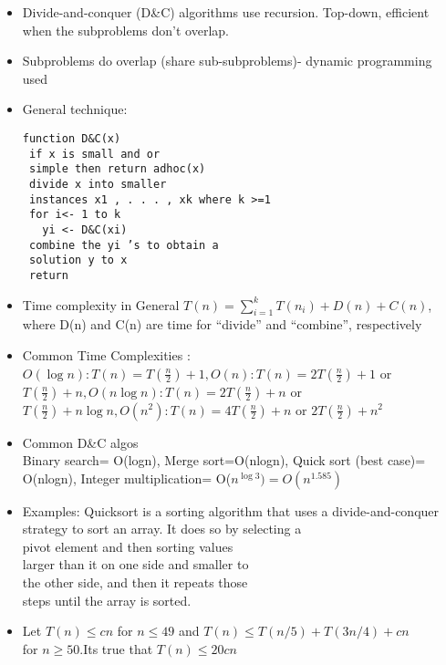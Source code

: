     \begin{itemize}[label=\bullet]
        \item Divide-and-conquer (D\&C) algorithms use recursion. Top-down, efficient when the subproblems don’t overlap.
        
         \item Subproblems do overlap (share sub-subproblems)-  dynamic programming used

        \item
        General technique:
        \begin{verbatim}
function D&C(x)
 if x is small and or 
 simple then return adhoc(x)
 divide x into smaller 
 instances x1 , . . . , xk where k >=1
 for i<- 1 to k
   yi <- D&C(xi)
 combine the yi ’s to obtain a 
 solution y to x
 return 
\end{verbatim}
\item Time complexity  in General
$T(n) = \sum_{i=1}^k T(n_i ) + D(n) +C(n)$, where D(n) and C(n) are time for “divide” and “combine”,
respectively
\item  Common Time Complexities :
\\$O(\log n):T(n)=T(\frac{n}{2})+1,  O(n):T(n)=2T(\frac{n}{2})+1$ or $T(\frac{n}{2})+n, O(n \log n): T(n)=2T(\frac{n}{2})+n$ or $T(\frac{n}{2})+n \log n, O(n^2): T(n)=4T(\frac{n}{2})+n$ or $2T(\frac{n}{2})+n^2$
\item Common D\&C algos
\\
Binary search= O(logn), Merge sort=O(nlogn), Quick sort (best case)= O(nlogn), Integer multiplication= O($n^{\log3})=O(n^{1.585})$
\item  Examples:
Quicksort is a sorting algorithm that uses a divide-and-conquer strategy to sort an array. 
It does so by selecting a\\ pivot element and then sorting values \\larger than it on one side and smaller to \\the other side, and then it repeats those \\steps until the array is sorted.
\item Let $T (n) \leq cn$ for $n \leq 49$ and $T (n) \leq T (n/5) + T (3n/4 ) + cn$\\ for $n \geq 50$.Its true that $T (n) \leq 20cn$



    \end{itemize}
   
   
